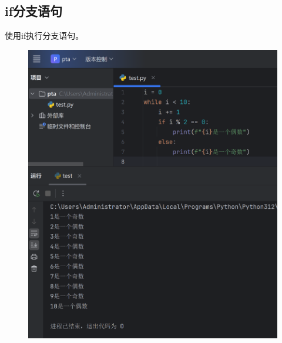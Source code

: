 \documentclass{article}
\begin{document}
\subsection{if分支语句}
使用if执行分支语句。
\begin{figure}[H]
    \centering
    \includegraphics[width=1\linewidth]{if.png}
\end{figure}


\newpage
\end{document}
